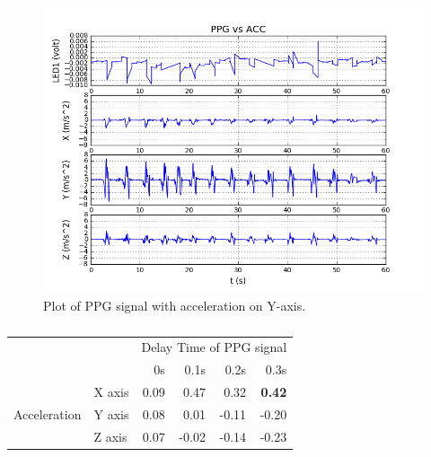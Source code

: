 \documentclass[11pt, draftclsnofoot, onecolumn]{IEEEtran}
\begin{document}
    \begin{figure}[h]	
        \centering
        \includegraphics[scale=0.50]{y_acc_ppg_acc_17} 
        \caption{Plot of PPG signal with acceleration on Y-axis.}
        \label{fig:Y_AccPPG}
    \end{figure}
    
    \begin{table}[ht]
	\centering
        \caption{}
		\label{table:Y_AccPPG}
		\begin{tabular}{ l l|r|r|r|r| }
			\cline{3-6}
            & & \multicolumn{4}{|c|}{Delay Time of PPG signal} \\
            \cline{3-6}
            	& & 0s & 0.1s & 0.2s & 0.3s  \\
			\hline
            \multicolumn{1}{|c|}{\multirow{3}{*}{Acceleration}} 
            	& X axis & 0.09  & 0.47  & 0.32  & \textbf{0.42}  \\
            \cline{2-6}
            \multicolumn{1}{|c|}{} 
            	& Y axis & 0.08  & 0.01  & -0.11 & -0.20  \\
            \cline{2-6}
            \multicolumn{1}{|c|}{} 
            	& Z axis & 0.07  & -0.02 & -0.14 & -0.23  \\
			\hline
		\end{tabular}
	\end{table}
    
\end{document}
